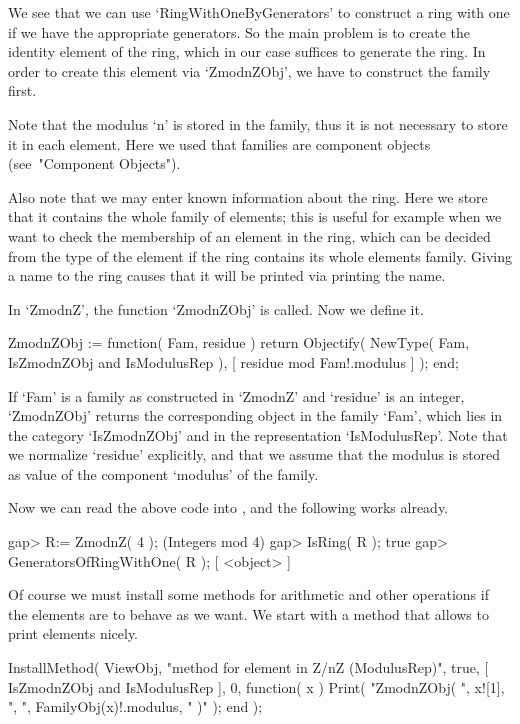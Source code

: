 We see that we can use `RingWithOneByGenerators' to construct a ring
with one if we have the appropriate generators.
So the main problem is to create the identity element of the ring,
which in our case suffices to generate the ring.
In order to create this element via `ZmodnZObj',
we have to construct the family first.

Note that the modulus `n' is stored in the family,
thus it is not necessary to store it in each element.
Here we used that families are component objects
(see~"Component Objects").

Also note that we may enter known information about the ring.
Here we store that it contains the whole family of elements;
this is useful for example when we want to check the membership of an
element in the ring, which can be decided from the type of the element
if the ring contains its whole elements family.
Giving a name to the ring causes that it will be printed
via printing the name.

In `ZmodnZ', the function `ZmodnZObj' is called.
Now we define it.

\begintt
    ZmodnZObj := function( Fam, residue )
        return Objectify( NewType( Fam, IsZmodnZObj and IsModulusRep ),
                          [ residue mod Fam!.modulus ] );
    end;
\endtt

If `Fam' is a family as constructed in `ZmodnZ'
and `residue' is an integer,
`ZmodnZObj' returns the corresponding object in the family `Fam',
which lies in the category `IsZmodnZObj' and in the representation
`IsModulusRep'.
Note that we normalize `residue' explicitly,
and that we assume that the modulus is stored as value of the component
`modulus' of the family.

Now we can read the above code into {\GAP},
and the following works already.

\begintt
    gap> R:= ZmodnZ( 4 );
    (Integers mod 4)
    gap> IsRing( R );
    true
    gap> GeneratorsOfRingWithOne( R );
    [ <object> ]
\endtt

Of course we must install some methods for arithmetic and other
operations if the elements are to behave as we want.
We start with a method that allows to print elements nicely.

\begintt
    InstallMethod( ViewObj,
        "method for element in Z/nZ (ModulusRep)",
        true,
        [ IsZmodnZObj and IsModulusRep ], 0,
        function( x )
        Print( "ZmodnZObj( ", x![1], ", ", FamilyObj(x)!.modulus, " )" );
        end );
\endtt


